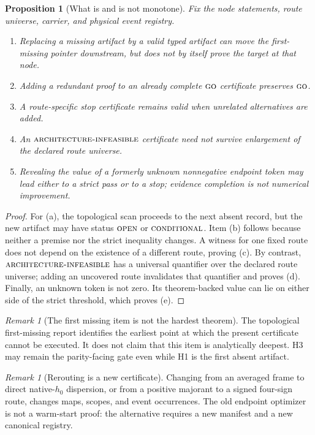 \documentclass[11pt]{article}
\newtheorem{proposition}[theorem]{Proposition}
\theoremstyle{definition}
\theoremstyle{remark}
\newtheorem{remark}[theorem]{Remark}
\newcommand{\GO}{\textnormal{\textsc{go}}}
\newcommand{\AINF}{\textnormal{\textsc{architecture-infeasible}}}
\newcommand{\OPEN}{\textnormal{\textsc{open}}}
\newcommand{\COND}{\textnormal{\textsc{conditional}}}
\begin{document}
\begin{proposition}[What is and is not monotone]
\label{prop:monotone}
Fix the node statements, route universe, carrier, and physical event
registry.
\begin{enumerate}[label=(\alph*),leftmargin=2em]
\item Replacing a missing artifact by a valid typed artifact can move
  the first-missing pointer downstream, but does not by itself prove
  the target at that node.
\item Adding a redundant proof to an already complete \(\GO\)
  certificate preserves \(\GO\).
\item A route-specific stop certificate remains valid when unrelated
  alternatives are added.
\item An \(\AINF\) certificate need not survive enlargement of the
  declared route universe.
\item Revealing the value of a formerly unknown nonnegative endpoint
  token may lead either to a strict pass or to a stop; evidence
  completion is not numerical improvement.
\end{enumerate}
\end{proposition}

\begin{proof}
For (a), the topological scan proceeds to the next absent record, but
the new artifact may have status \(\OPEN\) or \(\COND\).  Item (b)
follows because neither a premise nor the strict inequality changes.
A witness for one fixed route does not depend on the existence of a
different route, proving (c).  By contrast, \(\AINF\) has a universal
quantifier over the declared route universe; adding an uncovered
route invalidates that quantifier and proves (d).  Finally, an
unknown token is not zero.  Its theorem-backed value can lie on
either side of the strict threshold, which proves (e).
\end{proof}

\begin{remark}[The first missing item is not the hardest theorem]
The topological first-missing report identifies the earliest point at
which the present certificate cannot be executed.  It does not claim
that this item is analytically deepest.  H3 may remain the parity-facing
gate even while H1 is the first absent artifact.
\end{remark}

\begin{remark}[Rerouting is a new certificate]
Changing from an averaged frame to direct native-\(h_0\) dispersion,
or from a positive majorant to a signed four-sign route, changes maps,
scopes, and event occurrences.  The old endpoint optimizer is not a
warm-start proof: the alternative requires a new manifest and a new
canonical registry.
\end{remark}
\end{document}
